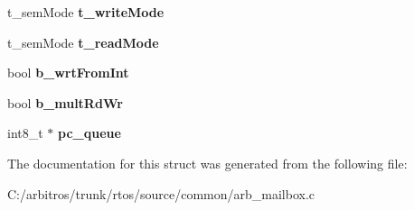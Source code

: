 \begin{DoxyCompactItemize}
\item 
\hypertarget{structt__mailbox_a6a280a171688e3dd25d9a5d86cbbf3c5}{t\-\_\-sem\-Mode {\bfseries t\-\_\-write\-Mode}}\label{structt__mailbox_a6a280a171688e3dd25d9a5d86cbbf3c5}

\item 
\hypertarget{structt__mailbox_a0605d9ce204d758b101f7420a464525a}{t\-\_\-sem\-Mode {\bfseries t\-\_\-read\-Mode}}\label{structt__mailbox_a0605d9ce204d758b101f7420a464525a}

\item 
\hypertarget{structt__mailbox_a9569db233967649615e97d1c48b4f647}{bool {\bfseries b\-\_\-wrt\-From\-Int}}\label{structt__mailbox_a9569db233967649615e97d1c48b4f647}

\item 
\hypertarget{structt__mailbox_a8ff60f9cd04293676351efc2b4f6cf5c}{bool {\bfseries b\-\_\-mult\-Rd\-Wr}}\label{structt__mailbox_a8ff60f9cd04293676351efc2b4f6cf5c}

\item 
\hypertarget{structt__mailbox_ad8773348cb433902cb742a9147ec947c}{int8\-\_\-t $\ast$ {\bfseries pc\-\_\-queue}}\label{structt__mailbox_ad8773348cb433902cb742a9147ec947c}

\end{DoxyCompactItemize}


The documentation for this struct was generated from the following file\-:\begin{DoxyCompactItemize}
\item 
C\-:/arbitros/trunk/rtos/source/common/arb\-\_\-mailbox.\-c\end{DoxyCompactItemize}
